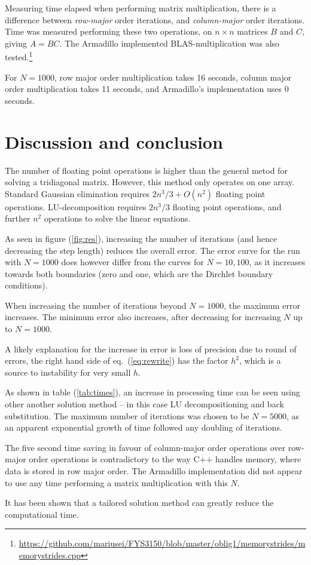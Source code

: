 \documentclass[a4paper,11pt]{article}
\begin{document}
    Measuring time elapsed when performing matrix multiplication, there is a difference between \textit{row-major} order iterations, and \textit{column-major} order iterations. Time was measured performing these two operations,  on $n\times n$ matrices $B$ and $C$, giving $A = BC$. The Armadillo implemented BLAS-multiplication was also tested.\footnote{\url{https://github.com/mariusei/FYS3150/blob/master/oblig1/memorystrides/memorystrides.cpp}}

    For $N=1000$, row major order multiplication takes 16 seconds, column major order multiplication takes 11 seconds, and Armadillo's implementation uses 0 seconds. 

    \section{Discussion and conclusion}
    The number of floating point operations is higher than the general metod for solving a tridiagonal matrix. However, this method only operates on one array. Standard Gaussian elimination requires $2n^3/3 + O(n^2)$ floating point operations. LU-decomposition requires $2n^3/3$ floating point operations, and further $n^2$ operations to solve the linear equations.  

    As seen in figure (\ref{fig:res}), increasing the number of iterations (and hence decreasing the step length) reduces the overall error. The error curve for the run with $N=1000$ does however differ from the curves for $N=10,100$, as it increases towards both boundaries (zero and one, which are the Dirchlet boundary conditions).

    When increasing the number of iterations beyond $N=1000$, the maximum error increases. The minimum error also increases, after decreasing for increasing $N$ up to $N=1000$. 

    A likely explanation for the increase in error is loss of precision due to round of errors, the right hand side of eq.~(\ref{eq:rewrite}) has the factor $h^2$, which is a source to instability for very small $h$. 

    As shown in table (\ref{tab:times}), an increase in processing time can be seen using other another solution method -- in this case LU decompositioning and back substitution. The maximum number of iterations was chosen to be $N=5000$, as an apparent exponential growth of time followed any doubling of iterations. 

    The five second time saving in favour of column-major order operations over row-major order operations is contradictory to the way C++ handles memory, where data is stored in row major order. The Armadillo implementation did not appear to use any time performing a matrix multiplication with this $N$.

    It has been shown that a tailored solution method can greatly reduce the computational time.
\end{document}
